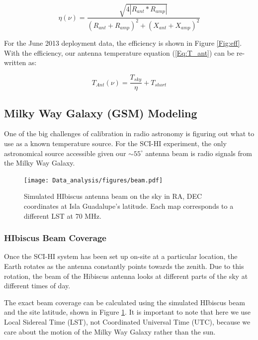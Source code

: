 \begin{equation}
\eta (\nu) = \frac{\sqrt{4 |R_{ant}*R_{amp}|}}{(R_{ant}+R_{amp})^2+(X_{ant}+X_{amp})^2}
\end{equation}

For the June 2013 deployment data, the efficiency is shown in Figure \ref{Fig:eff}. With the efficiency, our antenna temperature equation (\ref{Eq:T_ant}) can be re-written as:

\begin{equation}
T_{Ant}(\nu) = \frac{T_{sky}}{\eta} + T_{short}
\end{equation}


\subsection{Milky Way Galaxy (GSM) Modeling}

One of the big challenges of calibration in radio astronomy is figuring out what to use as a known temperature source. For the SCI-HI experiment, the only astronomical source accessible given our $\sim 55 ^\circ$ antenna beam is radio signals from the Milky Way Galaxy. 

\begin{figure}[htb]
\begin{center}
\texttt{[image: Data\_analysis/figures/beam.pdf]}
\caption{Simulated HIbiscus antenna beam on the sky in RA, DEC coordinates at Isla Guadalupe's latitude. Each map corresponds to a different LST at 70 MHz. }
\label{Fig:HIbiscus_beam}
\end{center}
\end{figure}

\subsubsection{HIbiscus Beam Coverage}

Once the SCI-HI system has been set up on-site at a particular location, the Earth rotates as the antenna constantly points towards the zenith. Due to this rotation, the beam of the Hibiscus antenna looks at different parts of the sky at different times of day. 

The exact beam coverage can be calculated using the simulated HIbiscus beam and the site latitude, shown in Figure \ref{Fig:HIbiscus_beam}.  It is important to note that here we use Local Sidereal Time (LST), not Coordinated Universal Time (UTC), because we care about the motion of the Milky Way Galaxy rather than the sun.  


